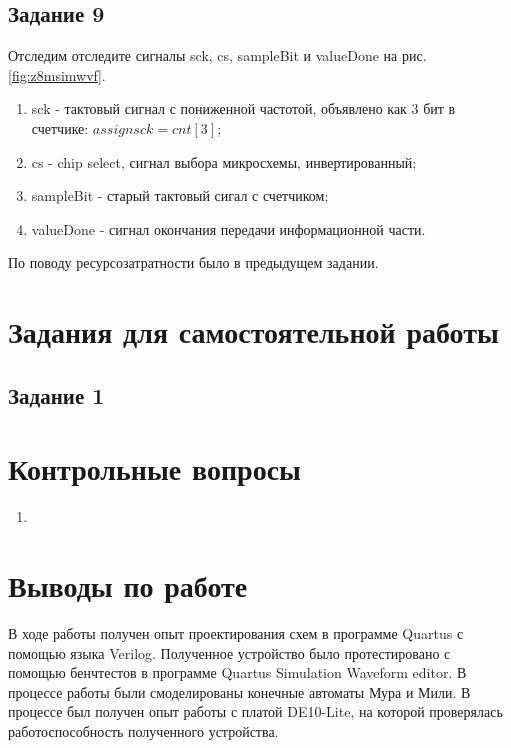 \documentclass[a4paper,14pt]{article}
\begin{document}
	\subsection{Задание 9}
	
	Отследим отследите сигналы sck, cs, sampleBit и valueDone на рис. \ref{fig:z8msimwvf}.
	
	\begin{enumerate}
		
		\item sck - тактовый сигнал с пониженной частотой, объявлено как 3 бит в счетчике: $assign sck = cnt [3]$;
		
		\item cs - chip select, сигнал выбора микросхемы, инвертированный;
		
		\item sampleBit - старый тактовый сигал с счетчиком;
		
		\item valueDone - сигнал окончания передачи информационной части.
	\end{enumerate}

	По поводу ресурсозатратности было в предыдущем задании.
	
	\section{Задания для самостоятельной работы}

	\subsection{Задание 1}

	\section{Контрольные вопросы}
	
	\begin{enumerate}
		
		\item   
	\end{enumerate}
	
	\section{Выводы по работе}
	
	В ходе работы получен опыт проектирования схем в программе Quartus с помощью языка Verilog.
	Полученное устройство было протестировано с помощью бенчтестов в программе Quartus Simulation Waveform editor.
	В процессе работы были смоделированы конечные автоматы Мура и Мили.
	В процессе был получен опыт работы с платой DE10-Lite, на которой проверялась работоспособность полученного устройства.
	
\end{document}
